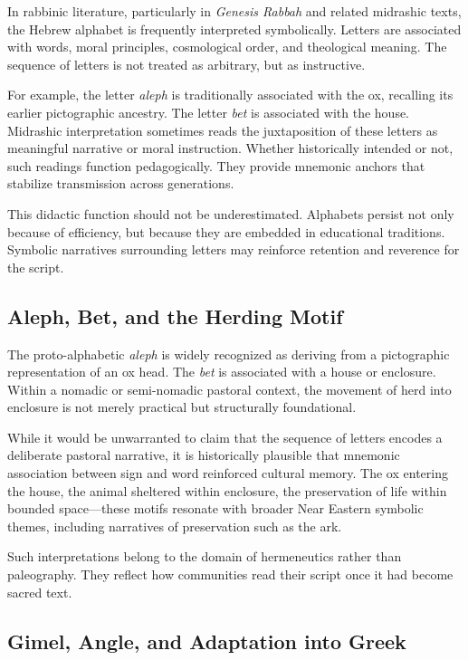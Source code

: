 \documentclass[11pt]{article}
\begin{document}
In rabbinic literature, particularly in \textit{Genesis Rabbah} and related midrashic texts, the Hebrew alphabet is frequently interpreted symbolically. Letters are associated with words, moral principles, cosmological order, and theological meaning. The sequence of letters is not treated as arbitrary, but as instructive.

For example, the letter \textit{aleph} is traditionally associated with the ox, recalling its earlier pictographic ancestry. The letter \textit{bet} is associated with the house. Midrashic interpretation sometimes reads the juxtaposition of these letters as meaningful narrative or moral instruction. Whether historically intended or not, such readings function pedagogically. They provide mnemonic anchors that stabilize transmission across generations.

This didactic function should not be underestimated. Alphabets persist not only because of efficiency, but because they are embedded in educational traditions. Symbolic narratives surrounding letters may reinforce retention and reverence for the script.

\subsection{Aleph, Bet, and the Herding Motif}

The proto-alphabetic \textit{aleph} is widely recognized as deriving from a pictographic representation of an ox head. The \textit{bet} is associated with a house or enclosure. Within a nomadic or semi-nomadic pastoral context, the movement of herd into enclosure is not merely practical but structurally foundational.

While it would be unwarranted to claim that the sequence of letters encodes a deliberate pastoral narrative, it is historically plausible that mnemonic association between sign and word reinforced cultural memory. The ox entering the house, the animal sheltered within enclosure, the preservation of life within bounded space—these motifs resonate with broader Near Eastern symbolic themes, including narratives of preservation such as the ark.

Such interpretations belong to the domain of hermeneutics rather than paleography. They reflect how communities read their script once it had become sacred text.

\subsection{Gimel, Angle, and Adaptation into Greek}
\end{document}
